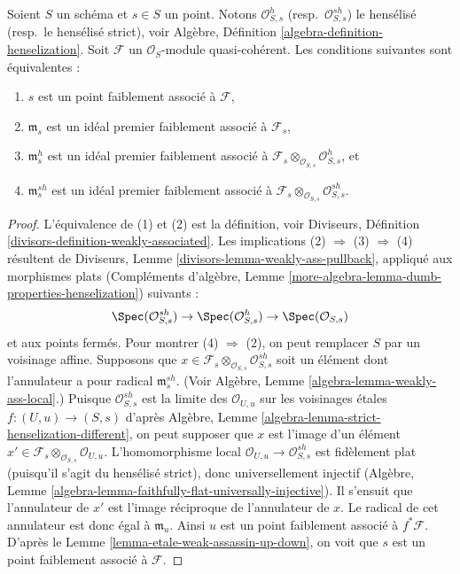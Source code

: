 \begin{lemma}
\label{lemma-weakly-associated-henselization}
Soient $S$ un schéma et $s \in S$ un point. Notons $\mathcal{O}_{S, s}^h$
(resp.\ $\mathcal{O}_{S, s}^{sh}$) le hensélisé (resp.\ le hensélisé
strict), voir
Algèbre, Définition \ref{algebra-definition-henselization}.
Soit $\mathcal{F}$ un $\mathcal{O}_S$-module quasi-cohérent.
Les conditions suivantes sont équivalentes :
\begin{enumerate}
\item $s$ est un point faiblement associé à $\mathcal{F}$,
\item $\mathfrak m_s$ est un idéal premier faiblement associé à $\mathcal{F}_s$,
\item $\mathfrak m_s^h$ est un idéal premier faiblement associé à
$\mathcal{F}_s \otimes_{\mathcal{O}_{S, s}} \mathcal{O}_{S, s}^h$, et
\item $\mathfrak m_s^{sh}$ est un idéal premier faiblement associé à
$\mathcal{F}_s \otimes_{\mathcal{O}_{S, s}} \mathcal{O}_{S, s}^{sh}$.
\end{enumerate}
\end{lemma}

\begin{proof}
L'équivalence de (1) et (2) est la définition, voir
Diviseurs, Définition \ref{divisors-definition-weakly-associated}.
Les implications (2) $\Rightarrow$ (3) $\Rightarrow$ (4)
résultent de Diviseurs, Lemme \ref{divisors-lemma-weakly-ass-pullback},
appliqué aux morphismes plats (Compléments d'algèbre, Lemme
\ref{more-algebra-lemma-dumb-properties-henselization})
suivants :
$$
\Spec(\mathcal{O}_{S, s}^{sh}) \to
\Spec(\mathcal{O}_{S, s}^h) \to
\Spec(\mathcal{O}_{S, s})
$$
et aux points fermés. Pour montrer (4) $\Rightarrow$ (2), on peut remplacer
$S$ par un voisinage affine. Supposons que
$x \in \mathcal{F}_s \otimes_{\mathcal{O}_{S, s}} \mathcal{O}_{S, s}^{sh}$
soit un élément dont l'annulateur a pour radical $\mathfrak m_s^{sh}$.
(Voir Algèbre, Lemme \ref{algebra-lemma-weakly-ass-local}.)
Puisque $\mathcal{O}_{S, s}^{sh}$ est la limite
des $\mathcal{O}_{U, u}$ sur les voisinages \'etales
$f : (U, u) \to (S, s)$ d'après Algèbre, Lemme
\ref{algebra-lemma-strict-henselization-different},
on peut supposer que $x$ est l'image d'un élément
$x' \in \mathcal{F}_s \otimes_{\mathcal{O}_{S, s}} \mathcal{O}_{U, u}$.
L'homomorphisme local $\mathcal{O}_{U, u} \to \mathcal{O}_{S, s}^{sh}$
est fidèlement plat (puisqu'il s'agit du hensélisé strict), donc
universellement injectif
(Algèbre, Lemme \ref{algebra-lemma-faithfully-flat-universally-injective}).
Il s'ensuit que l'annulateur de $x'$ est l'image réciproque de
l'annulateur de $x$. Le radical de cet annulateur
est donc égal à $\mathfrak m_u$.
Ainsi $u$ est un point faiblement associé à $f^*\mathcal{F}$.
D'après le Lemme \ref{lemma-etale-weak-assassin-up-down},
on voit que $s$ est un point faiblement associé à $\mathcal{F}$.
\end{proof}





